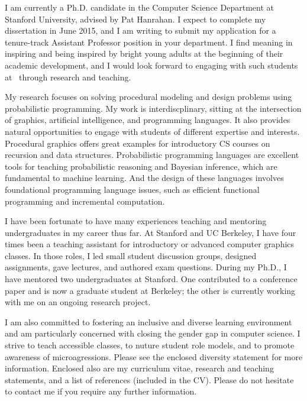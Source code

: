\documentclass[10pt,stdletter,dateno,sigleft]{newlfm} %
\begin{document}
\begin{newlfm}


I am currently a Ph.D. candidate in the Computer Science Department at Stanford University, advised by Pat Hanrahan. I expect to complete my dissertation in June 2015, and I am writing to submit my application for a tenure-track Assistant Professor position in your department.
I find meaning in inspiring and being inspired by bright young adults at the beginning of their academic development, and I would look forward to engaging with such students at \UniversityShort~through research and teaching.

My research focuses on solving procedural modeling and design problems using probabilistic programming.
My work is interdiscplinary, sitting at the intersection of graphics, artificial intelligence, and programming languages. It also provides natural opportunities to engage with students of different expertise and interests. Procedural graphics offers great examples for introductory CS courses on recursion and data structures. Probabilistic programming languages are excellent tools for teaching probabilistic reasoning and Bayesian inference, which are fundamental to machine learning. And the design of these languages involves foundational programming language issues, such as efficient functional programming and incremental computation.

I have been fortunate to have many experiences teaching and mentoring undergraduates in my career thus far. At Stanford and UC Berkeley, I have four times been a teaching assistant for introductory or advanced computer graphics classes. In those roles, I led small student discussion groups, designed assignments, gave lectures, and authored exam questions. During my Ph.D., I have mentored two undergraduates at Stanford. One contributed to a conference paper and is now a graduate student at Berkeley; the other is currently working with me on an ongoing research project.

I am also committed to fostering an inclusive and diverse learning environment and am particularly concerned with closing the gender gap in computer science. I strive to teach accessible classes, to nuture student role models, and to promote awareness of microagressions.
Please see the enclosed diversity statement for more information.
Enclosed also are my curriculum vitae, research and teaching statements, and a list of references (included in the CV). Please do not hesitate to contact me if you require any further information.


\end{newlfm}
\end{document}
